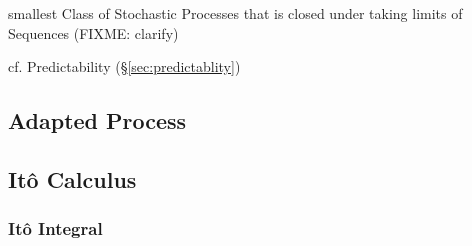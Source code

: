smallest Class of Stochastic Processes that is closed under taking limits of
Sequences (FIXME: clarify)

cf. Predictability (\S\ref{sec:predictablity})



\subsection{Adapted Process}\label{sec:adapted_process}

\subsection{It\^o Calculus}\label{sec:ito_calculus}

\subsubsection{It\^o Integral}\label{sec:ito_integral}
